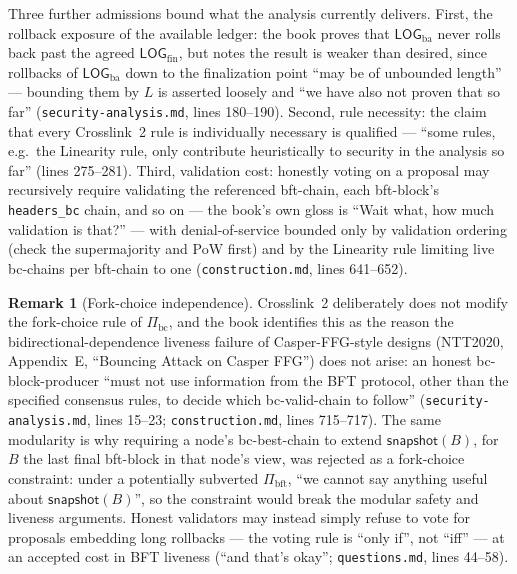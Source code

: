 \documentclass[11pt,a4paper]{article}
\theoremstyle{definition}
\newtheorem{remark}[theorem]{Remark}
\begin{document}
Three further admissions bound what the analysis currently delivers.
First, the rollback exposure of the available ledger: the book proves that
$\mathsf{LOG}_{\mathrm{ba}}$ never rolls back past the agreed
$\mathsf{LOG}_{\mathrm{fin}}$, but notes the result is weaker than
desired, since rollbacks of $\mathsf{LOG}_{\mathrm{ba}}$ down to the
finalization point ``may be of unbounded length'' --- bounding them by $L$
is asserted loosely and ``we have also not proven that so far''
(\texttt{security-analysis.md}, lines 180--190). Second, rule necessity:
the claim that every Crosslink~2 rule is individually necessary is
qualified --- ``some rules, e.g.\ the Linearity rule, only contribute
heuristically to security in the analysis so far'' (lines 275--281).
Third, validation cost: honestly voting on a proposal may recursively
require validating the referenced bft-chain, each bft-block's
\texttt{headers\_bc} chain, and so on --- the book's own gloss is ``Wait
what, how much validation is that?'' --- with denial-of-service bounded
only by validation ordering (check the supermajority and PoW first) and by
the Linearity rule limiting live bc-chains per bft-chain to one
(\texttt{construction.md}, lines 641--652).

\begin{remark}[Fork-choice independence]\label{rem:xl-fork-choice}
Crosslink~2 deliberately does not modify the fork-choice rule of
$\Pi_{\mathrm{bc}}$, and the book identifies this as the reason the
bidirectional-dependence liveness failure of Casper-FFG-style designs
(NTT2020, Appendix~E, ``Bouncing Attack on Casper FFG'') does not arise:
an honest bc-block-producer ``must not use information from the BFT
protocol, other than the specified consensus rules, to decide which
bc-valid-chain to follow'' (\texttt{security-analysis.md}, lines 15--23;
\texttt{construction.md}, lines 715--717). The same modularity is why
requiring a node's bc-best-chain to extend $\mathsf{snapshot}(B)$, for $B$
the last final bft-block in that node's view, was rejected as a fork-choice
constraint: under a potentially subverted
$\Pi_{\mathrm{bft}}$, ``we cannot say anything useful about
$\mathsf{snapshot}(B)$'', so the constraint would break the modular
safety and liveness arguments. Honest validators may instead simply refuse
to vote for proposals embedding long rollbacks --- the voting rule is
``only if'', not ``iff'' --- at an accepted cost in BFT liveness (``and
that's okay''; \texttt{questions.md}, lines 44--58).
\end{remark}
\end{document}

